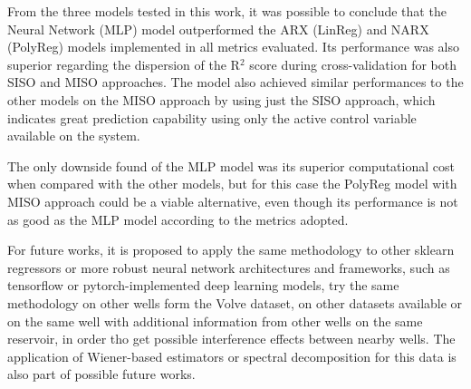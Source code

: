 \documentclass[conference]{IEEEtran}
\begin{document}
From the three models tested in this work, it was possible to conclude that the Neural Network (MLP) model outperformed the ARX (LinReg) and NARX (PolyReg) models implemented in all metrics evaluated. Its performance was also superior regarding the dispersion of the R$^2$ score during cross-validation for both SISO and MISO approaches. The model also achieved similar performances to the other models on the MISO approach by using just the SISO approach, which indicates great prediction capability using only the active control variable available on the system.

The only downside found of the MLP model was its superior computational cost when compared with the other models, but for this case the PolyReg model with MISO approach could be a viable alternative, even though its performance is not as good as the MLP model according to the metrics adopted.

For future works, it is proposed to apply the same methodology to other sklearn regressors or more robust neural network architectures and frameworks, such as tensorflow or pytorch-implemented deep learning models, try the same methodology on other wells form the Volve dataset, on other datasets available or on the same well with additional information from other wells on the same reservoir, in order tho get possible interference effects between nearby wells. The application of Wiener-based estimators or spectral decomposition for this data is also part of possible future works.





% 

%




\end{document}
